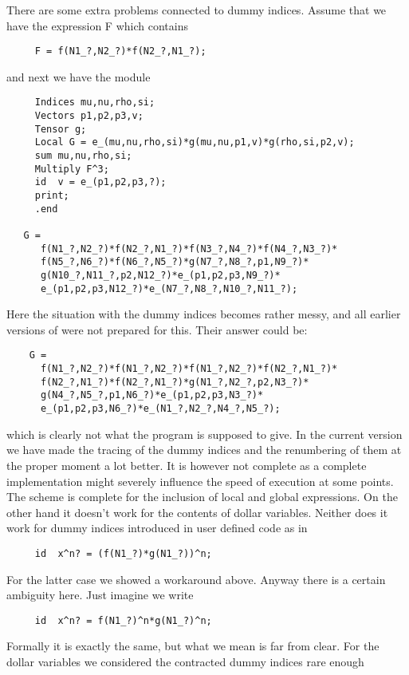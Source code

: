 There are some extra problems connected to dummy indices. Assume that we 
have the expression F which contains
\begin{verbatim}
     F = f(N1_?,N2_?)*f(N2_?,N1_?);
\end{verbatim}
and next we have the module
\begin{verbatim}
     Indices mu,nu,rho,si;
     Vectors p1,p2,p3,v;
     Tensor g;
     Local G = e_(mu,nu,rho,si)*g(mu,nu,p1,v)*g(rho,si,p2,v);
     sum mu,nu,rho,si;
     Multiply F^3;
     id  v = e_(p1,p2,p3,?);
     print;
     .end

   G =
      f(N1_?,N2_?)*f(N2_?,N1_?)*f(N3_?,N4_?)*f(N4_?,N3_?)*
      f(N5_?,N6_?)*f(N6_?,N5_?)*g(N7_?,N8_?,p1,N9_?)*
      g(N10_?,N11_?,p2,N12_?)*e_(p1,p2,p3,N9_?)*
      e_(p1,p2,p3,N12_?)*e_(N7_?,N8_?,N10_?,N11_?);
\end{verbatim}
Here the situation with the dummy indices becomes rather messy, and all 
earlier versions of {\FORM} were not prepared for this. Their answer could be:
\begin{verbatim}
    G =
      f(N1_?,N2_?)*f(N1_?,N2_?)*f(N1_?,N2_?)*f(N2_?,N1_?)*
      f(N2_?,N1_?)*f(N2_?,N1_?)*g(N1_?,N2_?,p2,N3_?)*
      g(N4_?,N5_?,p1,N6_?)*e_(p1,p2,p3,N3_?)*
      e_(p1,p2,p3,N6_?)*e_(N1_?,N2_?,N4_?,N5_?);
\end{verbatim}
which is clearly not what the program is supposed to give. In the current 
version we have made the tracing of the dummy indices and the renumbering 
of them at the proper moment a lot better. It is however not complete as a 
complete implementation might severely influence the speed of execution at 
some points. The scheme is complete for the inclusion of local and global 
expressions. On the other hand it doesn't work for the contents of dollar 
variables. Neither does it work for dummy indices 
introduced in user defined code as in
\begin{verbatim}
     id  x^n? = (f(N1_?)*g(N1_?))^n;
\end{verbatim}
For the latter case we showed a workaround above. Anyway there is a certain 
ambiguity here. Just imagine we write
\begin{verbatim}
     id  x^n? = f(N1_?)^n*g(N1_?)^n;
\end{verbatim}
Formally it is exactly the same, but what we mean is far from clear. For 
the dollar variables we considered the contracted dummy indices rare enough 
